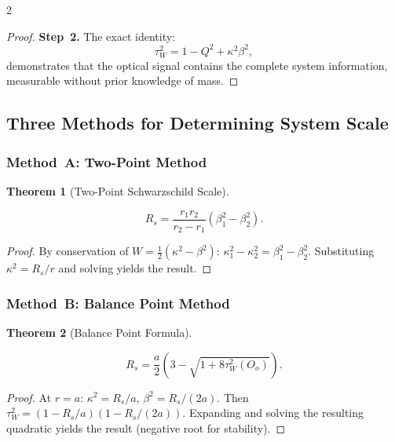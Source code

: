 \documentclass[10pt, a4paper]{article}
\newtheorem{theorem}{Theorem}[section]
\begin{document}
\begin{multicols}{2}
\begin{proof}
\textbf{Step~2.} The exact identity:
\begin{equation}
\tau_W^2 = 1 - Q^2 + \kappa^2\beta^2,
\end{equation}
demonstrates that the optical signal contains the complete system information, measurable without prior knowledge of mass.
\end{proof}

\subsection{Three Methods for Determining System Scale}

\subsubsection{Method~A: Two-Point Method}

\begin{theorem}[Two-Point Schwarzschild Scale]
\hypertarget{thm:two_point}{}\label{thm:two_point}
\hypertarget{eq:Rs_two_point}{}\label{eq:Rs_two_point}
\begin{equation}
\boxed{R_s = \frac{r_1 r_2}{r_2 - r_1}(\beta_1^2 - \beta_2^2).}
\end{equation}
\end{theorem}

\begin{proof}
By conservation of $W = \frac{1}{2}(\kappa^2-\beta^2)$: $\kappa_1^2 - \kappa_2^2 = \beta_1^2 - \beta_2^2$. Substituting $\kappa^2 = R_s/r$ and solving yields the result.
\end{proof}

\subsubsection{Method~B: Balance Point Method}

\begin{theorem}[Balance Point Formula]
\hypertarget{thm:balance_point}{}\label{thm:balance_point}
\hypertarget{eq:Rs_balance}{}\label{eq:Rs_balance}
\begin{equation}
\boxed{R_s = \frac{a}{2}(3 - \sqrt{1 + 8\tau_W^2(O_o)}).}
\end{equation}
\end{theorem}

\begin{proof}
At $r=a$: $\kappa^2 = R_s/a$, $\beta^2 = R_s/(2a)$. Then $\tau_W^2 = (1-R_s/a)(1-R_s/(2a))$. Expanding and solving the resulting quadratic yields the result (negative root for stability).
\end{proof}


\end{multicols}
\end{document}
